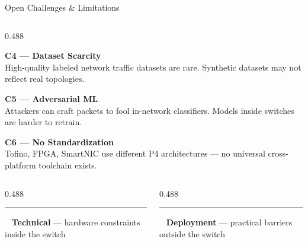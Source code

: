 {\begin{frame}{Open Challenges \& Limitations}
\begin{columns}[T, totalwidth=\textwidth]
\begin{column}{0.488\textwidth}
      \begin{tcolorbox}[problemcard=problemred]
        {\color{problemred}\bfseries\scriptsize
          C4 — Dataset Scarcity}\\[2pt]
        {\fontsize{7}{8}\selectfont\color{HUAdark}
          High-quality labeled network traffic datasets
          are rare. Synthetic datasets may not reflect
          real topologies.}
      \end{tcolorbox}

      \vspace{4pt}

      \begin{tcolorbox}[problemcard=problemred]
        {\color{problemred}\bfseries\scriptsize
          C5 — Adversarial ML}\\[2pt]
        {\fontsize{7}{8}\selectfont\color{HUAdark}
          Attackers can craft packets to fool in-network
          classifiers. Models inside switches are
          harder to retrain.}
      \end{tcolorbox}

      \vspace{4pt}

      \begin{tcolorbox}[problemcard=problemred]
        {\color{problemred}\bfseries\scriptsize
          C6 — No Standardization}\\[2pt]
        {\fontsize{7}{8}\selectfont\color{HUAdark}
          Tofino, FPGA, SmartNIC use different P4
          architectures --- no universal cross-platform
          toolchain exists.}
      \end{tcolorbox}

    \end{column}

  \end{columns}

  \vspace{0.15cm}

\begin{columns}[totalwidth=\textwidth]
  \begin{column}{0.488\textwidth}
    {\fontsize{7}{8}\selectfont
      \textcolor{problemorange}{\rule{0.8em}{0.8em}}~
      \textcolor{problemorange}{\bfseries Technical}
      --- hardware constraints inside the switch}
  \end{column}
  \begin{column}{0.488\textwidth}
    {\fontsize{7}{8}\selectfont
      \textcolor{problemred}{\rule{0.8em}{0.8em}}~
      \textcolor{problemred}{\bfseries Deployment}
      --- practical barriers outside the switch}
  \end{column}
\end{columns}

\end{frame}
}